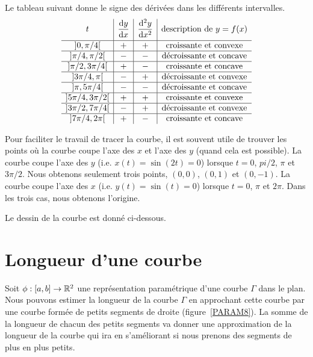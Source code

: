 {\begin{egg}[\theory]
Le tableau suivant donne le signe des dérivées dans les différents
intervalles.
\[
\begin{array}{c|c|c|c}
t & \displaystyle \frac{\mathrm{d}y}{\mathrm{d}x} & \displaystyle \frac{\mathrm{d}^{2}y}{\mathrm{d}x^{2}} &
\text{description de } y = f(x) \\[0.7em]
\hline
]0,\pi/4[ & + & + & \text{croissante et convexe} \\
\hline
]\pi/4,\pi/2[ & - & - & \text{décroissante et concave} \\
\hline
]\pi/2,3\pi/4[ & + & - & \text{croissante et concave} \\
\hline
]3\pi/4,\pi[ & - & + & \text{décroissante et convexe} \\
\hline
]\pi,5\pi/4[ & - & - & \text{décroissante et concave} \\
\hline
]5\pi/4,3\pi/2[ & + & + & \text{croissante et convexe} \\
\hline
]3\pi/2,7\pi/4[ & - & + & \text{décroissante et convexe} \\
\hline
]7\pi/4,2\pi[ & + & - & \text{croissante et concave}
\end{array}
\]

Pour faciliter le travail de tracer la courbe, il est souvent utile de
trouver les points où la courbe coupe l'axe des $x$ et l'axe des $y$
(quand cela est possible).  La courbe coupe l'axe des $y$
(i.e. $x(t)=\sin(2t)=0$) lorsque $t=0$, $pi/2$, $\pi$ et $3\pi/2$.  Nous
obtenons seulement trois points, $(0,0)$, $(0,1)$ et $(0,-1)$.  La
courbe coupe l'axe des $x$ (i.e. $y(t)=\sin(t)=0$) lorsque $t=0$,
$\pi$ et $2\pi$.  Dans les trois cas, nous obtenons l'origine.

Le dessin de la courbe est donné ci-dessous.
\end{egg}

\section{Longueur d'une courbe \eng}

Soit $\phi:[a,b]\rightarrow \mathbb{R}^2$ une représentation paramétrique
d'une courbe $\Gamma$ dans le plan.  Nous pouvons estimer la longueur de la
courbe $\Gamma$ en approchant cette courbe par une courbe formée de
petits segments de droite (figure~\ref{PARAM8}).
La somme de la longueur de chacun des petits segments va donner une
approximation de la longueur de la courbe qui ira en s'améliorant si
nous prenons des segments de plus en plus petits.


}
